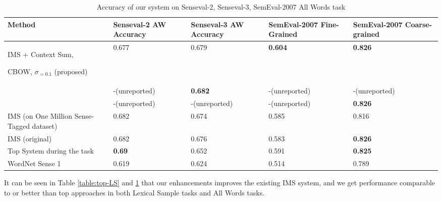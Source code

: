 \begin{table}
	\caption{Accuracy of our system on Senseval-2, Senseval-3, SemEval-2007 All Words task}
	\label{table:All-AW}
	\begin{center}
		\begin{tabular}{| p{4cm} | p{2cm} | p{3cm} | p{3cm} | p{3cm} | }
			\hline
			Method & Senseval-2 AW Accuracy & Senseval-3 AW Accuracy & SemEval-2007 Fine-Grained & SemEval-2007 Coarse-grained \\
			\hline
			IMS + Context Sum, 
			
			CBOW, $\sigma _{=0.1}$ (proposed) & 0.677 & 0.679 & {\bf0.604} & {\bf 0.826 } \\
			\hline
			
			\cite{Taghipour15} & -(unreported) & {\bf0.682} & -(unreported) & -(unreported) \\
			\hline
			\cite{chen2014} & -(unreported) & -(unreported) & -(unreported) & {\bf 0.826 } \\
			\hline
			IMS (on One Million Sense-Tagged dataset) & 0.682 & 0.674 & 0.585 & 0.816 \\
			\hline
			IMS (original) & 0.682 & 0.676 & 0.583 & {\bf 0.826 }  \\
			\hline
			Top System during the task & {\bf0.69} & 0.652 & 0.591 & {\bf 0.825 } \\
			\hline
			WordNet Sense 1 & 0.619 & 0.624 & 0.514 & 0.789\\
			\hline
		\end{tabular}
	\end{center}
\end{table}


It can be seen in Table \ref{table:top-LS} and \ref{table:All-AW} that our enhancements improves the existing IMS system, and we get performance comparable to or better than top approaches in both Lexical Sample tasks and All Words tasks. 

